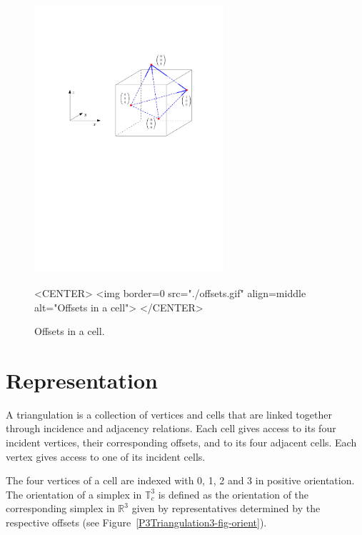 \begin{figure}[htbp]
\begin{ccTexOnly}
\begin{center} 
\includegraphics[width=7cm]{Periodic_3_triangulation_3/offsets} 
\end{center}
\end{ccTexOnly}
\begin{ccHtmlOnly}
<CENTER>
<img border=0 src="./offsets.gif" align=middle alt="Offsets in a cell">
</CENTER>
\end{ccHtmlOnly}
\caption{Offsets in a cell.
\label{P3Triangulation3-fig-offsets}}
\end{figure} 

\section{Representation\label{P3Triangulation3-sec-intro}}

A triangulation is a collection of vertices and cells that are linked
together through incidence and adjacency relations. Each cell gives
access to its four incident vertices, their corresponding offsets, and
to its four adjacent cells. Each vertex gives access to one of its
incident cells.

The four vertices of a cell are indexed with 0, 1, 2 and 3 in positive
orientation. The orientation of a simplex in $\mathbb T_c^3$ is
defined as the orientation of the corresponding simplex in $\mathbb
R^3$ given by representatives determined by the respective offsets
(see Figure~\ref{P3Triangulation3-fig-orient}).

